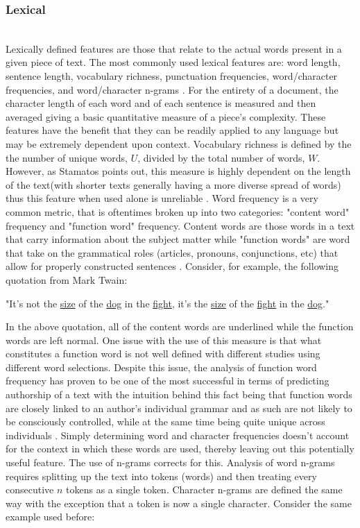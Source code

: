 \documentclass[pageno]{jpaper}
\begin{document}
\subsubsection{Lexical}
\label{sec:lexical}
\indent \\
Lexically defined features are those that relate to the actual words present in a given piece of text.  The most commonly used lexical features are: word length, sentence length, vocabulary richness, punctuation frequencies, word/character frequencies, and word/character n-grams \cite{survey}.  For the entirety of a document, the character length of each word and of each sentence is measured and then averaged giving a basic quantitative measure of a piece's complexity.  These features have the benefit that they can be readily applied to any language \cite{survey} but may be extremely dependent upon context.  Vocabulary richness is defined by the the number of unique words, $U$, divided by the total number of words, $W$.  However, as Stamatos points out, this measure is highly dependent on the length of the text(with shorter texts generally having a more diverse spread of words) thus this feature when used alone is unreliable \cite{survey}.  Word frequency is a very common metric, that is oftentimes broken up into two categories: "content word" frequency and "function word" frequency.  Content words are those words in a text that carry information about the subject matter while "function words" are word that take on the grammatical roles (articles, pronouns, conjunctions, etc) that allow for properly constructed sentences \cite{performance_of_features}.  Consider, for example, the following quotation from Mark Twain:
\begin{center}"It's not the \underline{size} of the \underline{dog} in the \underline{fight}, it's the \underline{size} of the \underline{fight} in the \underline{dog}." \end{center} In the above quotation, all of the content words are underlined while the function words are left normal.  One issue with the use of this measure is that what constitutes a function word is not well defined with different studies using different word selections.  Despite this issue, the analysis of function word frequency has proven to be one of the most successful in terms of predicting authorship of a text \cite{performance_of_features} with the intuition behind this fact being that function words are closely linked to an author's individual grammar and as such are not likely to be consciously controlled, while at the same time being quite unique across individuals \cite{Argamon05measuringthe}.  Simply determining word and character frequencies doesn't account for the context in which these words are used, thereby leaving out this potentially useful feature.  The use of n-grams corrects for this.  Analysis of word n-grams requires splitting up the text into tokens (words) and then treating every consecutive $n$ tokens as a single token.  Character n-grams are defined the same way with the exception that a token is now a single character.  Consider the same example used before: 
\end{document}
